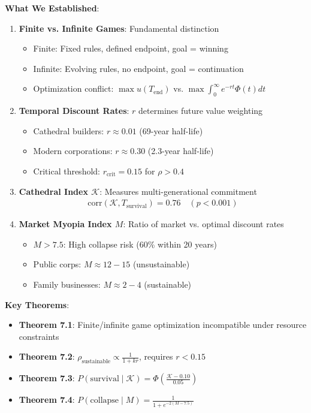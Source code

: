 \documentclass[11pt,a4paper]{article}
\theoremstyle{definition}
\theoremstyle{remark}
\begin{document}
\begin{enumerate}
\begin{mdframed}[backgroundcolor=green!10,linewidth=2pt,linecolor=green!70!black]
\textbf{What We Established}:
\begin{enumerate}[nosep]
    \item \textbf{Finite vs. Infinite Games}: Fundamental distinction
        \begin{itemize}[nosep]
            \item Finite: Fixed rules, defined endpoint, goal = winning
            \item Infinite: Evolving rules, no endpoint, goal = continuation
            \item Optimization conflict: \(\max u(T_{\text{end}})\) vs. \(\max \int_0^\infty e^{-rt}\Phi(t)dt\)
        \end{itemize}
    \item \textbf{Temporal Discount Rates}: \(r\) determines future value weighting
        \begin{itemize}[nosep]
            \item Cathedral builders: \(r \approx 0.01\) (69-year half-life)
            \item Modern corporations: \(r \approx 0.30\) (2.3-year half-life)
            \item Critical threshold: \(r_{\text{crit}} = 0.15\) for \(\rho > 0.4\)
        \end{itemize}
    \item \textbf{Cathedral Index \(\mathcal{K}\)}: Measures multi-generational commitment
        \begin{align}
        \text{corr}(\mathcal{K}, T_{\text{survival}}) = 0.76 \quad (p < 0.001)
        \end{align}
    \item \textbf{Market Myopia Index \(M\)}: Ratio of market vs. optimal discount rates
        \begin{itemize}[nosep]
            \item \(M > 7.5\): High collapse risk (60\% within 20 years)
            \item Public corps: \(M \approx 12-15\) (unsustainable)
            \item Family businesses: \(M \approx 2-4\) (sustainable)
        \end{itemize}
\end{enumerate}

\textbf{Key Theorems}:
\begin{itemize}[nosep]
    \item \textbf{Theorem 7.1}: Finite/infinite game optimization incompatible under resource constraints
    \item \textbf{Theorem 7.2}: \(\rho_{\text{sustainable}} \propto \frac{1}{1+kr}\), requires \(r < 0.15\)
    \item \textbf{Theorem 7.3}: \(P(\text{survival} \mid \mathcal{K}) = \Phi\left(\frac{\mathcal{K}-0.10}{0.05}\right)\)
    \item \textbf{Theorem 7.4}: \(P(\text{collapse} \mid M) = \frac{1}{1+e^{-2(M-7.5)}}\)
\end{itemize}


\end{mdframed}
\end{enumerate}
\end{document}
